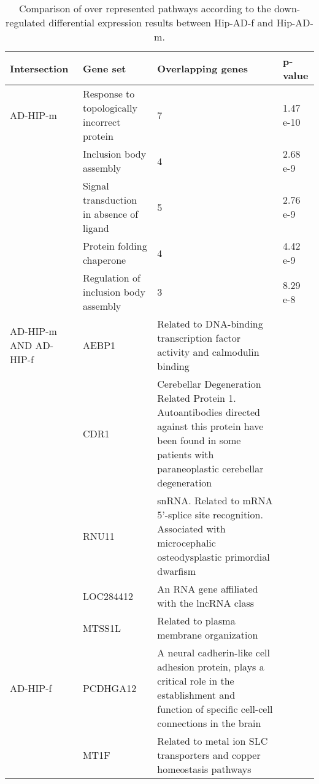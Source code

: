 \begin{table}[!ht]
\centering
\caption{Comparison of over represented pathways according to the down-regulated differential expression results between Hip-AD-f and Hip-AD-m.}
\begin{tabularx}{1.0\textwidth}{L{2cm}L{2.5cm}L{8cm}C{1.5cm}}
\toprule
\textbf{Intersection} & \textbf{Gene set} & \textbf{Overlapping genes} & \textbf{p-value} \\
\midrule
AD-HIP-m & Response to topologically   incorrect protein & 7                                                                     & 1.47 e-10 \\
         & Inclusion body assembly                       & 4                                                                     & 2.68 e-9  \\
         & Signal transduction in absence of ligand      & 5                                                                     & 2.76 e-9  \\
         & Protein folding chaperone                     & 4                                                                     & 4.42 e-9  \\
         & Regulation of inclusion body assembly         & 3                                                                     & 8.29 e-8  \\
AD-HIP-m AND AD-HIP-f &
  AEBP1 &
  Related to DNA-binding transcription factor activity and calmodulin binding &
   \\
 &
  CDR1 &
  Cerebellar Degeneration Related Protein 1. Autoantibodies directed against this protein have been found in some patients with paraneoplastic cerebellar degeneration &
   \\
 &
  RNU11 &
  snRNA. Related to mRNA 5'-splice site recognition. Associated with microcephalic osteodysplastic primordial dwarfism &
   \\
         & LOC284412                                     & An RNA gene affiliated with the lncRNA class                          &           \\
         & MTSS1L                                        & Related to plasma membrane organization                               &           \\
AD-HIP-f &
  PCDHGA12 &
  A neural cadherin-like cell adhesion protein, plays a critical role in the establishment and function of specific cell-cell connections in the brain &
   \\
         & MT1F                                          & Related to metal ion SLC transporters and copper homeostasis pathways &           \\ 
\bottomrule

\end{tabularx}
\end{table}


